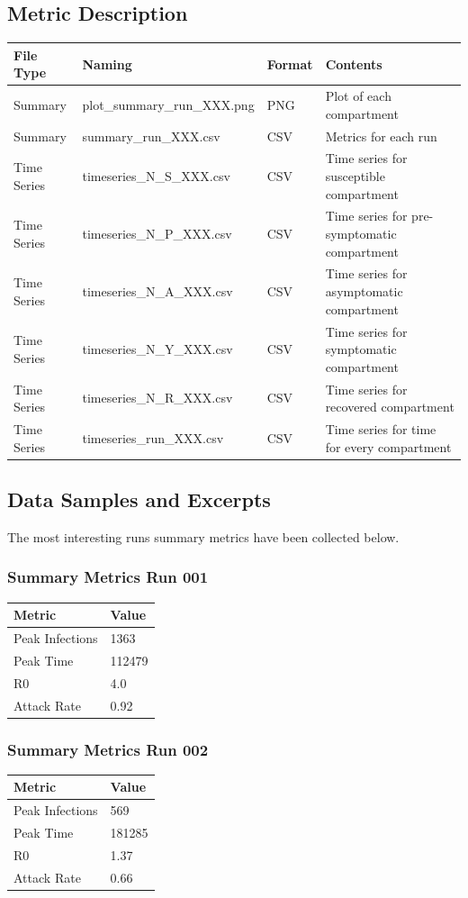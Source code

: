 \documentclass{article}
\begin{document}
\subsection{Metric Description}
\begin{tabular}{| l | l | l | l |}
  \hline
  File Type & Naming & Format & Contents \\ [0.5ex]
  \hline\hline 
  Summary & plot\_summary\_run\_XXX.png & PNG & Plot of each compartment \\
  \hline
  Summary & summary\_run\_XXX.csv & CSV & Metrics for each run \\
  \hline
  Time Series & timeseries\_N\_S\_XXX.csv & CSV & Time series for susceptible compartment \\
  \hline
  Time Series & timeseries\_N\_P\_XXX.csv & CSV & Time series for pre-symptomatic compartment \\
  \hline
  Time Series & timeseries\_N\_A\_XXX.csv & CSV & Time series for asymptomatic compartment \\
  \hline
  Time Series & timeseries\_N\_Y\_XXX.csv & CSV & Time series for symptomatic compartment \\
  \hline
  Time Series & timeseries\_N\_R\_XXX.csv & CSV & Time series for recovered compartment \\
  \hline
  Time Series & timeseries\_run\_XXX.csv & CSV & Time series for time for every compartment \\
  \hline\hline 
\end{tabular}

\subsection{Data Samples and Excerpts}
The most interesting runs summary metrics have been collected below.
\subsubsection{Summary Metrics Run 001}
\begin{tabular}{| l | l |}
  \hline
  Metric & Value \\
  \hline\hline
  Peak Infections & 1363 \\
  \hline
  Peak Time & 112479 \\
  \hline
  R0 & 4.0 \\
  \hline
  Attack Rate & 0.92 \\
  \hline
\end{tabular} 
\subsubsection{Summary Metrics Run 002}
\begin{tabular}{| l | l |}
  \hline
  Metric & Value \\
  \hline\hline
  Peak Infections & 569 \\
  \hline
  Peak Time & 181285 \\
  \hline
  R0 & 1.37 \\
  \hline
  Attack Rate & 0.66 \\
  \hline
\end{tabular} 
\end{document}
